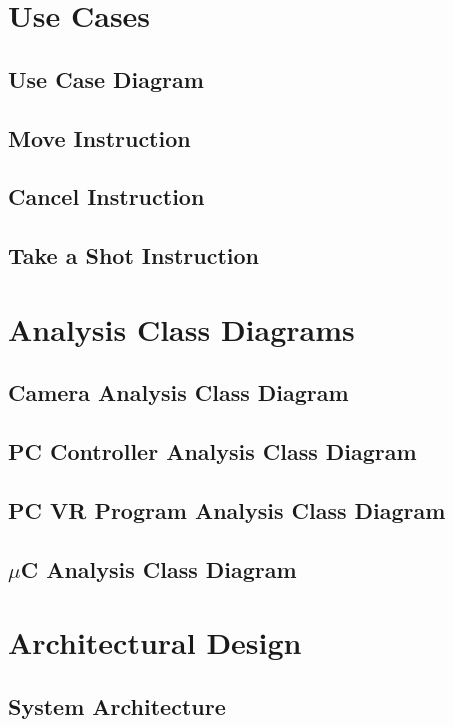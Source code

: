 \documentclass[titlepage]{article}
\begin{document}
\section{Use Cases}
\subsection{Use Case Diagram}
\subsection{Move Instruction}
\subsection{Cancel Instruction}
\subsection{Take a Shot Instruction}


\section{Analysis Class Diagrams}
\subsection{Camera Analysis Class Diagram}
\subsection{PC Controller Analysis Class Diagram}
\subsection{PC VR Program Analysis Class Diagram}
\subsection{$\mu$C Analysis Class Diagram}


\section{Architectural Design}%
\subsection{System Architecture}
\end{document}
